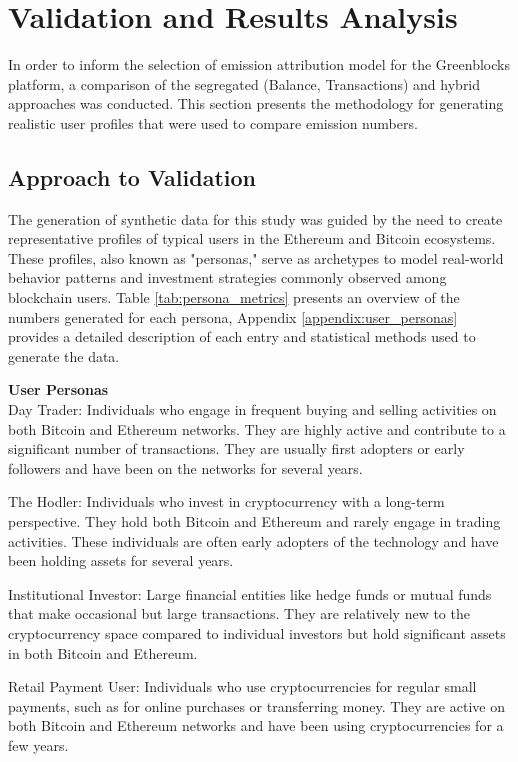 \documentclass[11pt]{report}
\begin{document}
\section{Validation and Results Analysis}

In order to inform the selection of emission attribution model for the Greenblocks platform, a comparison of the segregated (Balance, Transactions) and hybrid approaches was conducted. This section presents the methodology for generating realistic user profiles that were used to compare emission numbers.

\subsection{Approach to Validation}

The generation of synthetic data for this study was guided by the need to create representative profiles of typical users in the Ethereum and Bitcoin ecosystems. These profiles, also known as "personas," serve as archetypes to model real-world behavior patterns and investment strategies commonly observed among blockchain users. Table \ref{tab:persona_metrics} presents an overview of the numbers generated for each persona, Appendix \ref{appendix:user_personas} provides a detailed description of each entry and statistical methods used to generate the data.

\textbf{User Personas} \\
Day Trader: Individuals who engage in frequent buying and selling activities on both Bitcoin and Ethereum networks. They are highly active and contribute to a significant number of transactions. They are usually first adopters or early followers and have been on the networks for several years.

The Hodler: Individuals who invest in cryptocurrency with a long-term perspective. They hold both Bitcoin and Ethereum and rarely engage in trading activities. These individuals are often early adopters of the technology and have been holding assets for several years.

Institutional Investor: Large financial entities like hedge funds or mutual funds that make occasional but large transactions. They are relatively new to the cryptocurrency space compared to individual investors but hold significant assets in both Bitcoin and Ethereum.

Retail Payment User: Individuals who use cryptocurrencies for regular small payments, such as for online purchases or transferring money. They are active on both Bitcoin and Ethereum networks and have been using cryptocurrencies for a few years.
\end{document}
